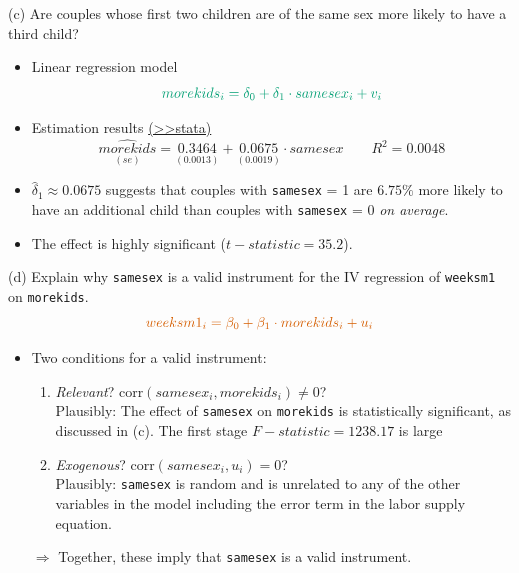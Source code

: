 \documentclass[
  10pt,
  ignorenonframetext,
]{beamer}
\providecommand{\tightlist}{%
  \setlength{\itemsep}{0pt}\setlength{\parskip}{0pt}}
\begin{document}
\begin{frame}[fragile]{(c) Are couples whose first two children are of
the same sex more likely to have a third child?}
\protect\hypertarget{q2-regFirstStage}{}
\begin{itemize}
\item
  Linear regression model \[
  \color{green}{morekids_i = \delta_0 + \delta_1 \cdot samesex_i + v_i}
  \]
\item
  Estimation results
  \footnotesize \protect\hyperlink{res2-regFirstStage}{(\textgreater\textgreater stata)}
  \normalsize \[
  \underset{(se)}{\widehat{morekids}} = \underset{(0.0013)}{0.3464} + \underset{(0.0019)}{0.0675} \cdot samesex \qquad R^2=0.0048
  \]
\item
  \(\hat{\delta}_1 \approx 0.0675\) suggests that couples with
  \texttt{samesex} = 1 are \(6.75\%\) more likely to have an additional
  child than couples with \texttt{samesex} = 0 \emph{on average}.
\item
  The effect is highly significant (\(t-statistic = 35.2\)).
\end{itemize}
\end{frame}

\begin{frame}[fragile]{(d) Explain why \texttt{samesex} is a valid
instrument for the IV regression of \texttt{weeksm1} on
\texttt{morekids}.}
\protect\hypertarget{d-explain-why-samesex-is-a-valid-instrument-for-the-iv-regression-of-weeksm1-on-morekids.}{}
\[
\color{red}{weeksm1_i = \beta_0 + \beta_1 \cdot morekids_i + u_i}
\]

\begin{itemize}
\tightlist
\item
  Two conditions for a valid instrument:

  \begin{enumerate}
  \tightlist
  \item
    \emph{Relevant}? \(\text{corr}(samesex_i,morekids_i) \neq 0\)?\\
    Plausibly: The effect of \texttt{samesex} on \texttt{morekids} is
    statistically significant, as discussed in (c). The first stage
    \(F-statistic = 1238.17\) is large \vspace{2mm}
  \item
    \emph{Exogenous}? \(\text{corr}(samesex_i,u_i) = 0\)?\\
    Plausibly: \texttt{samesex} is random and is unrelated to any of the
    other variables in the model including the error term in the labor
    supply equation.
  \end{enumerate}

  \vspace{2mm}

  \(\Rightarrow\) Together, these imply that \texttt{samesex} is a valid
  instrument.
\end{itemize}
\end{frame}
\end{document}
